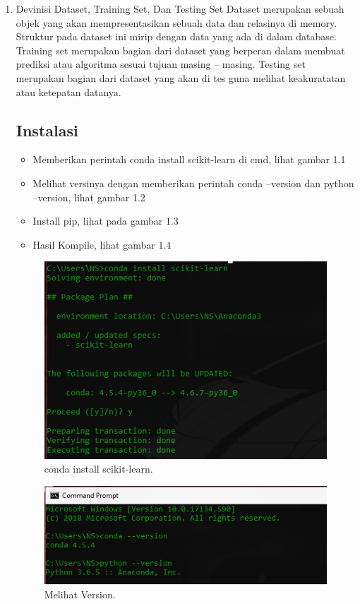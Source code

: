 \begin{enumerate}
\item
Devinisi Dataset, Training Set, Dan Testing Set
\subitem
Dataset merupakan sebuah objek yang akan mempresentasikan sebuah data dan relasinya di memory. Struktur pada dataset ini mirip dengan data yang ada di dalam database. Training set merupakan bagian dari dataset yang berperan dalam membuat prediksi atau algoritma sesuai tujuan masing – masing. Testing set merupakan bagian dari dataset yang akan di tes guna melihat keakuratatan atau ketepatan datanya.

\subsection{Instalasi}

\begin{itemize}
\item
Memberikan perintah conda install scikit-learn di cmd, lihat gambar 1.1
\item
Melihat versinya dengan memberikan perintah conda --version dan python --version, lihat gambar 1.2
\item
Install pip, lihat pada gambar 1.3
\item
Hasil Kompile, lihat gambar 1.4
\end{itemize}

\begin{figure}[ht]
\centerline{\includegraphics[width=1\textwidth]{figures/32.PNG}}
\caption{conda install scikit-learn.}
\end{figure}

\begin{figure}[ht]
\centerline{\includegraphics[width=1\textwidth]{figures/31.PNG}}
\caption{Melihat Version.}
\end{figure}


\end{enumerate}
